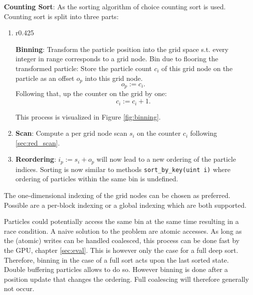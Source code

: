 \documentclass[m,times]{cgMA}
\begin{document}
\textbf{Counting Sort}: As the sorting algorithm of choice counting sort is used.
Counting sort is split into three parts:
\begin{enumerate}
  \item
\parbox[t]{\dimexpr\textwidth-\leftmargin}{%
      \vspace{-7.5}
      \begin{wrapfigure}[10]{r}{0.425\textwidth}
	\vspace{-33}
 
  \caption{Binning: Particle adds one to $c_i$ after storing it as $o_p$.}
  \label{fig:binning}
\end{wrapfigure}
\textbf{Binning}: Transform the particle position into the grid space s.t. every integer in range corresponds to a grid node. Bin due to flooring the transformed particle: Store the particle count $c_i$ of this grid node on the particle as an offset $o_p$ into this grid node.$$o_p := c_i.$$Following that, up the counter on the grid by one:$$c_i := c_i +1.$$
}
This process is visualized in Figure \ref{fig:binning}.
  \item \textbf{Scan}: Compute a per grid node scan $s_i$ on the counter $c_i$ following \ref{sec:red_scan}.

  \item \textbf{Reordering}: $i_p := s_i + o_p$ will now lead to a new ordering of the particle indices. Sorting is now similar to methods \texttt{sort\_by\_key(uint i)} where ordering of particles within the same bin is undefined.
\end{enumerate}
\begin{flushright}\cite{NVIDIA:NNSEARCH}\cite{MPM:GPU}\end{flushright}

The one-dimensional indexing of the grid nodes can be chosen as preferred. Possible are a per-block indexing or a global indexing which are both supported.

Particles could potentially access the same bin at the same time resulting in a race condition. A naive solution to the problem are atomic accesses. As long as the (atomic) writes can be handled coalesced, this process can be done fast by the GPU, chapter \ref{sec:eval}. This is however only the case for a full deep sort. Therefore, binning in the case of a full sort acts upon the last sorted state. Double buffering particles allows to do so. However binning is done after a position update that changes the ordering. Full coalescing will therefore generally not occur.
\end{document}
